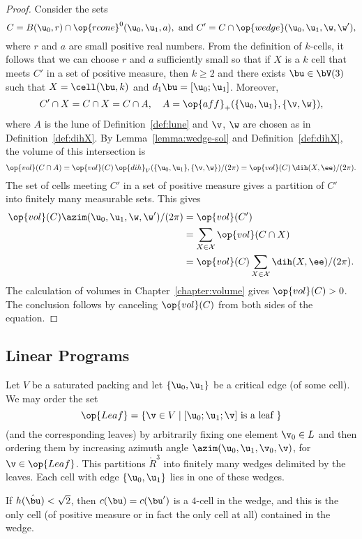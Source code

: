 \begin{proof} 
  Consider the sets
\[
C=B(\u_0,r)\cap \op{rcone}^0(\u_0,\u_1,a),\text{ and } C' = C\cap \op{wedge}(\u_0,\u_1,\w,\w') ,
\]
 where
  $r$ and $a$ are small positive real numbers.  From the definition of
  $k$-cells, it follows that we can choose $r$ and $a$ sufficiently
  small so that if $X$ is a $k$ cell that meets $C'$ in a set of
  positive measure, then $k\ge 2$ and there exists $\bu\in \bV(3)$
  such that $X=\cell(\bu,k)$ and $d_1\bu=[\u_0;\u_1]$.  Moreover,
\[
C'\cap X = C\cap X = C\cap A, \quad A=\op{aff}_+(\{\u_0,\u_1\},\{\v,\w\}),
\]
where $A$ is the lune of Definition~\ref{def:lune} and $\v$, $\w$ are
chosen as in Definition~\ref{def:dihX}.  By
Lemma~\ref{lemma:wedge-sol} and Definition~\ref{def:dihX}, the volume
of this intersection is
\[
\op{vol}(C\cap A) = \op{vol}(C)\,
 {\op{dih}_V(\{\u_0,\u_1\},\{\v,\w\}) }/{(2\pi)} =
  \op{vol}(C)\, {\dih(X,\ee)}/{(2\pi)}.
\]
The set of cells meeting $C'$ in a set of positive measure gives a 
partition of $C'$ into finitely many measurable sets.
This gives
\begin{align*}
\op{vol}(C) \azim(\u_0,\u_1,\w,\w')/(2\pi) &= 
\op{vol}(C') \\
&= \sum_{X\in\cX} \op{vol}(C\cap X)  \\
&= \op{vol}(C)\sum_{X\in\cX} \dih(X,\ee)/(2\pi).
\end{align*}
The calculation of volumes in Chapter~\ref{chapter:volume} gives
$\op{vol}(C)>0$.  The conclusion follows by canceling $\op{vol}(C)$
from both sides of the equation.
\end{proof}


\subsection{Linear Programs}

Let $V$ be a saturated packing and let $\{\u_0,\u_1\}$ be a critical edge (of some cell).
We may order the set 
\[
\op{Leaf} = \{ \v\in V \mid [\u_0;\u_1;\v] \text{ is a leaf } \}
\]
(and the corresponding leaves)
by arbitrarily fixing one element $\v_0\in L$ and then ordering them by increasing
azimuth angle $\azim(\u_0,\u_1,\v_0,\v)$, for $\v\in \op{Leaf}$.  This partitions $\ring{R}^3$ into
finitely many wedges delimited by the leaves.  Each cell with edge $\{\u_0,\u_1\}$ lies in one of these
wedges.    

If $h(\hat\bu) < \sqrt2$, then $c(\bu)=c(\bu')$ is a $4$-cell in the wedge,
 and this is the only cell  (of positive measure or in fact the only cell at all)
contained in the wedge.

